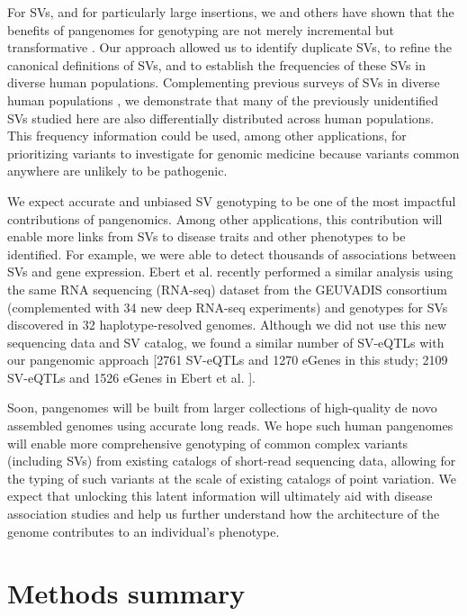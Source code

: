 \documentclass[11pt]{ucscthesis}
\begin{document}
For SVs, and for particularly large insertions, we and others have shown that the benefits of pangenomes for genotyping are not merely incremental but transformative \cite{hickey_vgsv_2020,li_minigraph_2020,chen_paragraph_2019}.
Our approach allowed us to identify duplicate SVs, to refine the canonical definitions of SVs, and to establish the frequencies of these SVs in diverse human populations.
Complementing previous surveys of SVs in diverse human populations \cite{1000gp_sv_2015,Ebert2021,sudmant2015svdiversity}, we demonstrate that many of the previously unidentified SVs studied here are also differentially distributed across human populations.
This frequency information could be used, among other applications, for prioritizing variants to investigate for genomic medicine because variants common anywhere are unlikely to be pathogenic.

We expect accurate and unbiased SV genotyping to be one of the most impactful contributions of pangenomics.
Among other applications, this contribution will enable more links from SVs to disease traits and other phenotypes to be identified.
For example, we were able to detect thousands of associations between SVs and gene expression.
Ebert et al. \cite{Ebert2021} recently performed a similar analysis using the same RNA sequencing (RNA-seq) dataset from the GEUVADIS consortium (complemented with 34 new deep RNA-seq experiments) and genotypes for SVs discovered in 32 haplotype-resolved genomes.
Although we did not use this new sequencing data and SV catalog, we found a similar number of SV-eQTLs with our pangenomic approach [2761 SV-eQTLs and 1270 eGenes in this study; 2109 SV-eQTLs and 1526 eGenes in Ebert et al. \cite{Ebert2021}].

Soon, pangenomes will be built from larger collections of high-quality de novo assembled genomes using accurate long reads.
We hope such human pangenomes will enable more comprehensive genotyping of common complex variants (including SVs) from existing catalogs of short-read sequencing data, allowing for the typing of such variants at the scale of existing catalogs of point variation.
We expect that unlocking this latent information will ultimately aid with disease association studies and help us further understand how the architecture of the genome contributes to an individual’s phenotype.

\section{Methods summary}
\end{document}
